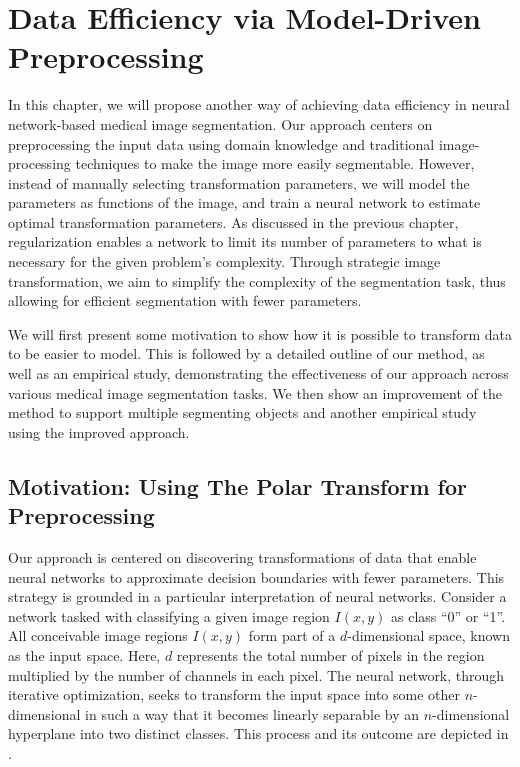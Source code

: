 
\chapter{Data Efficiency via Model-Driven Preprocessing}
\label{chap:model-driven-preprocessing}

In this chapter, we will propose another way of achieving data efficiency in neural network-based medical image segmentation. Our approach centers on preprocessing the input data using domain knowledge and traditional image-processing techniques to make the image more easily segmentable. However, instead of manually selecting transformation parameters, we will model the parameters as functions of the image, and train a neural network to estimate optimal transformation parameters. As discussed in the previous chapter, regularization enables a network to limit its number of parameters to what is necessary for the given problem's complexity. Through strategic image transformation, we aim to simplify the complexity of the segmentation task, thus allowing for efficient segmentation with fewer parameters.

 We will first present some motivation to show how it is possible to transform data to be easier to model. This is followed by a detailed outline of our method, as well as an empirical study, demonstrating the effectiveness of our approach across various medical image segmentation tasks. We then show an improvement of the method to support multiple segmenting objects and another empirical study using the improved approach.

\section{Motivation: Using The Polar Transform for Preprocessing}

Our approach is centered on discovering transformations of data that enable neural networks to approximate decision boundaries with fewer parameters. This strategy is grounded in a particular interpretation of neural networks. Consider a network tasked with classifying a given image region \(I(x, y)\) as class ``0'' or ``1''. All conceivable image regions \(I(x, y)\) form part of a \(d\)-dimensional space, known as the input space. Here, \(d\) represents the total number of pixels in the region multiplied by the number of channels in each pixel. The neural network, through iterative optimization, seeks to transform the input space into some other $n$-dimensional in such a way that it becomes linearly separable by an $n$-dimensional hyperplane into two distinct classes. This process and its outcome are depicted in .

